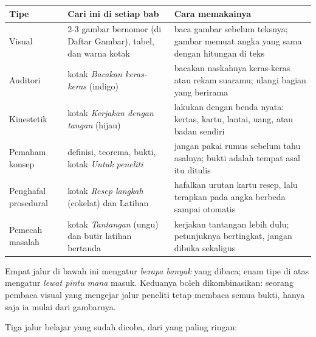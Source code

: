 \begin{center}
\small
\begin{tabular}{@{}p{3.4cm}p{4.3cm}p{4.6cm}@{}}
\toprule
\textbf{Tipe} & \textbf{Cari ini di setiap bab} & \textbf{Cara memakainya} \\
\midrule
Visual & 2-3 gambar bernomor (di Daftar Gambar), tabel, dan warna kotak & baca
  gambar sebelum teksnya; gambar memuat angka yang sama dengan hitungan di teks \\[2pt]
Auditori & kotak \emph{Bacakan keras-keras} (indigo) & bacakan naskahnya keras-keras
  atau rekam suaramu; ulangi bagian yang berirama \\[2pt]
Kinestetik & kotak \emph{Kerjakan dengan tangan} (hijau) & lakukan dengan benda nyata:
  kertas, kartu, lantai, uang, atau badan sendiri \\[2pt]
Pemaham konsep & definisi, teorema, bukti, kotak \emph{Untuk peneliti} & jangan pakai
  rumus sebelum tahu asalnya; bukti adalah tempat asal itu ditulis \\[2pt]
Penghafal prosedural & kotak \emph{Resep langkah} (cokelat) dan Latihan & hafalkan
  urutan kartu resep, lalu terapkan pada angka berbeda sampai otomatis \\[2pt]
Pemecah masalah & kotak \emph{Tantangan} (ungu) dan butir latihan bertanda &
  kerjakan tantangan lebih dulu; petunjuknya bertingkat, jangan dibuka sekaligus \\
\bottomrule
\end{tabular}
\end{center}

Empat jalur di bawah ini mengatur \emph{berapa banyak} yang dibaca; enam tipe di atas
mengatur \emph{lewat pintu mana} masuk. Keduanya boleh dikombinasikan: seorang pembaca
visual yang mengejar jalur peneliti tetap membaca semua bukti, hanya saja ia mulai dari
gambarnya.

Tiga jalur belajar yang sudah dicoba, dari yang paling ringan:

